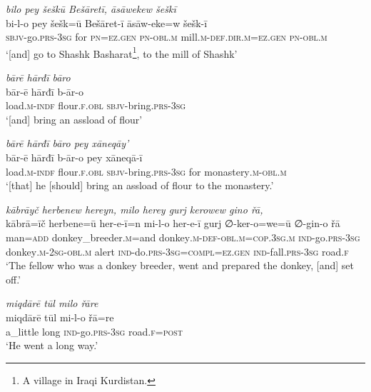 \ea \label{HB.12}
\textit{bilo pey šeškū Bešāretī, āsāwekew šeškī} \\ 
\gll bi-l-o pey šešk=ū Bešāret-ī āsāw-eke=w šešk-ī \\ 
 \textsc{sbjv-}go\textsc{.prs}\textsc{-3sg} for \textsc{pn}\textsc{=ez}\textsc{.gen} \textsc{pn}\textsc{-obl}\textsc{.m} mill\textsc{.m}\textsc{-def}\textsc{.dir}\textsc{.m}\textsc{=ez}\textsc{.gen} \textsc{pn}\textsc{-obl}\textsc{.m} \\ 
\glt `[and] go to Shashk Basharat\footnote{A village in Iraqi Kurdistan.}, to the mill of Shashk'
\z 
 
\ea \label{HB.13}
\textit{bārē hārđī bāro} \\ 
\gll bār-ē hārđī b-ār-o \\ 
 load\textsc{.m}\textsc{-indf} flour\textsc{\textsc{.f}}\textsc{.obl} \textsc{sbjv-}bring\textsc{.prs}\textsc{-3sg} \\ 
\glt `[and] bring an assload of flour'
\z 
 
\ea \label{HB.14}
\textit{bārē hārđī bāro pey xāneqāy’} \\ 
\gll bār-ē hārđī b-ār-o pey xāneqā-ī \\ 
 load\textsc{.m}\textsc{-indf} flour\textsc{\textsc{.f}}\textsc{.obl} \textsc{sbjv-}bring\textsc{.prs}\textsc{-3sg} for monastery\textsc{.m}\textsc{-obl}\textsc{.m} \\ 
\glt `[that] he [should] bring an assload of flour to the monastery.'
\z 
 
\ea \label{HB.15}
\textit{kābrāyč herbenew hereyn, milo herey gurj kerowew gino řā,} \\ 
\gll kābrā=īč herbene=ū her-e-ī=n mi-l-o her-e-ī gurj ∅-ker-o=we=ū ∅-gin-o řā \\ 
 man\textsc{=add} donkey\_breeder\textsc{.m}=and donkey\textsc{.m}\textsc{-def}\textsc{-obl}\textsc{.m}\textsc{=cop}\textsc{.3sg}\textsc{.m} \textsc{ind-}go\textsc{.prs}\textsc{-3sg} donkey\textsc{.m}-\textsc{2sg}\textsc{-obl}\textsc{.m} alert \textsc{ind-}do\textsc{.prs}\textsc{-3sg}\textsc{=\textsc{compl}}\textsc{=ez}\textsc{.gen} \textsc{ind-}fall\textsc{.prs}\textsc{-3sg} road\textsc{\textsc{.f}} \\ 
\glt `The fellow who was a donkey breeder, went and prepared the donkey, [and] set off.'
\z 
 
\ea \label{HB.16}
\textit{miqdārē tūl milo řāre} \\ 
\gll miqdārē tūl mi-l-o řā=re \\ 
 a\_little long \textsc{ind-}go\textsc{.prs}\textsc{-3sg} road\textsc{\textsc{.f}}\textsc{=\textsc{post}} \\ 
\glt `He went a long way.'
\z 
 
